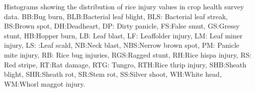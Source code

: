 Histograms showing the distribution of rice injury values in crop health survey data. BB:Bug burn, BLB:Bacterial leaf blight, BLS: Bacterial leaf streak, BS:Brown spot, DH:Deadheart, DP: Dirty panicle, FS:False smut, GS:Gressy stunt, HB:Hopper burn, LB: Leaf blast, LF: Leaffolder injury, LM: Leaf miner injury, LS: :Leaf scald, NB:Neck blast, NBS:Nerrow brown spot, PM: Panicle mite injury, RB: Rice bug injuries, RGS:Ragged stunt, RH:Rice hispa injury, RS: Red stripe, RT:Rat damage, RTG: Tungro, RTH:Rice thrip injury, SHB:Sheath blight, SHR:Sheath rot, SR:Stem rot, SS:Silver shoot, WH:White head, WM:Whorl maggot injury.
\label{fig:allhisto}
